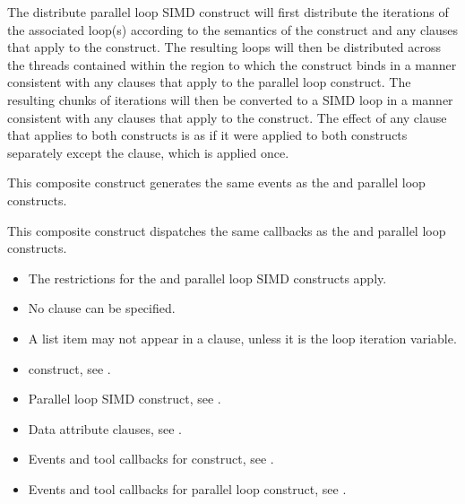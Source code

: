 \descr
The distribute parallel loop SIMD construct will first distribute the iterations of the 
associated loop(s) according to the semantics of the  construct and any 
clauses that apply to the  construct. The resulting loops will then be 
distributed across the threads contained within the  region to which the
 construct binds in a manner consistent with any clauses that apply to the 
parallel loop construct. The resulting chunks of iterations will then be converted to a 
SIMD loop in a manner consistent with any clauses that apply to the  construct. 
The effect of any clause that applies to both constructs is as if it were applied to both constructs separately except the  clause, which is applied once.

\events

This composite construct generates the same events as the  and parallel loop constructs.

\tools

This composite construct dispatches the same callbacks as the  and parallel loop constructs.

\restrictions
\begin{itemize}
\item The restrictions for the  and parallel loop SIMD constructs apply.
\item No  clause can be specified.
\item A list item may not appear in a  clause, unless it is the loop iteration variable.
\end{itemize}

\crossreferences
\begin{itemize}
\item {} construct, see 
.

\item Parallel loop SIMD construct, see 
.

\item Data attribute clauses, see .

\item Events and tool callbacks for  construct, see
.

\item Events and tool callbacks for parallel loop construct, see
.

\end{itemize}
